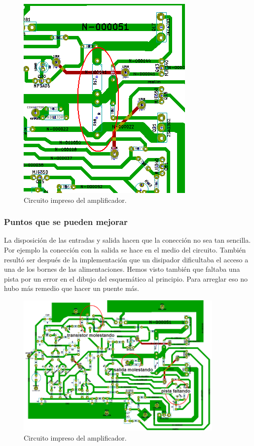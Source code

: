 \begin{figure}[H]
\centering
\includegraphics[scale=1]{img/PCB3.png}
\caption{Circuito impreso del amplificador.}
\end{figure}

\subsubsection*{Puntos que se pueden mejorar}
La disposición de las entradas y salida hacen que la conección no sea tan sencilla. Por ejemplo la conección con la salida se hace en el medio del circuito. También resultó ser después de la implementación que un disipador dificultaba el acceso a una de los bornes de las alimentaciones. 
Hemos visto también que faltaba una pista por un error en el dibujo del esquemático al principio. Para arreglar eso no hubo más remedio que hacer un puente más.

\begin{figure}[H]
\centering
\includegraphics[width=0.9\textwidth]{img/PCB4.png}
\caption{Circuito impreso del amplificador.}
\end{figure}


